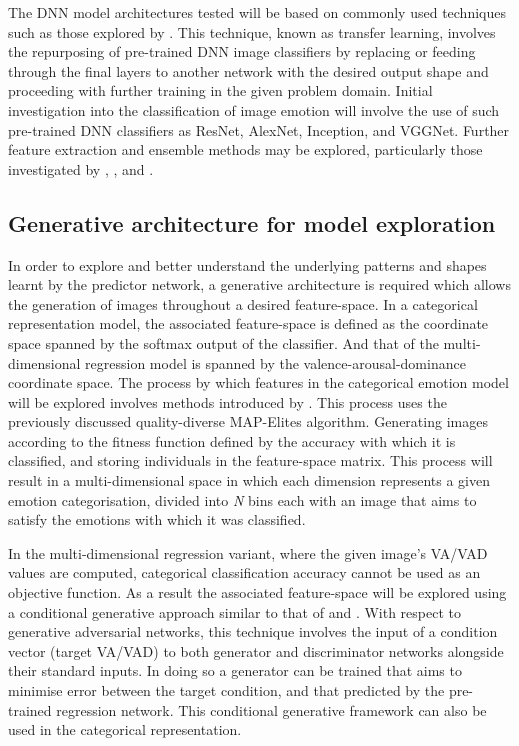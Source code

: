 \documentclass{article}
\begin{document}
The DNN model architectures tested will be based on commonly used techniques such as those explored by \citet{kim2018building, chen2015learning}.
This technique, known as transfer learning, involves the repurposing of pre-trained DNN image classifiers by replacing or feeding through the final layers to another network with the desired output shape and proceeding with further training in the given problem domain.
Initial investigation into the classification of image emotion will involve the use of such pre-trained DNN classifiers as ResNet, AlexNet, Inception, and VGGNet.
Further feature extraction and ensemble methods may be explored, particularly those investigated by \citet{kim2018building}, \citet{chen2015learning}, and \citet{chen2015learning}.

\subsection{Generative architecture for model exploration}
In order to explore and better understand the underlying patterns and shapes learnt by the predictor network, a generative architecture is required which allows the generation of images throughout a desired feature-space.
In a categorical representation model, the associated feature-space is defined as the coordinate space spanned by the softmax output of the classifier.
And that of the multi-dimensional regression model is spanned by the valence-arousal-dominance coordinate space.
The process by which features in the categorical emotion model will be explored involves methods introduced by \citet{nguyen2015deep,nguyen2015innovation}.
This process uses the previously discussed quality-diverse MAP-Elites algorithm.
Generating images according to the fitness function defined by the accuracy with which it is classified, and storing individuals in the feature-space matrix.
This process will result in a multi-dimensional space in which each dimension represents a given emotion categorisation, divided into \textit{N} bins each with an image that aims to satisfy the emotions with which it was classified.

In the multi-dimensional regression variant, where the given image's VA/VAD values are computed, categorical classification accuracy cannot be used as an objective function.
As a result the associated feature-space will be explored using a conditional generative approach similar to that of \citet{tan2017artgan} and \citet{gauthier2014conditional}.
With respect to generative adversarial networks, this technique involves the input of a condition vector (target VA/VAD) to both generator and discriminator networks alongside their standard inputs.
In doing so a generator can be trained that aims to minimise error between the target condition, and that predicted by the pre-trained regression network.
This conditional generative framework can also be used in the categorical representation.
\end{document}
